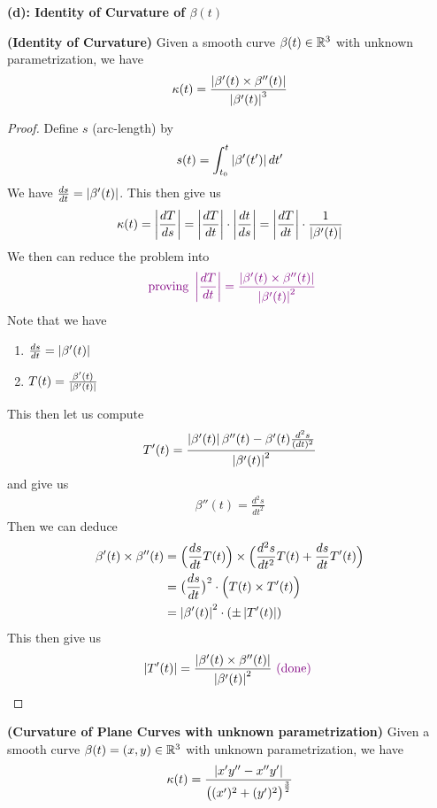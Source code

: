 \documentclass{report}
\begin{document}
\textbf{(d): Identity of Curvature of $\beta(t)$} 
\begin{theorem}
\textbf{(Identity of Curvature)} Given a smooth curve $\beta (t)\in\mathbb{R}^3$ with unknown parametrization, we have 
\begin{align*}
\kappa(t)=\frac{\left|\beta '(t)\times \beta ''(t)\right|}{\left|\beta '(t)\right|^3}
\end{align*}
\end{theorem}
\begin{proof}
Define $s$  (arc-length) by
\begin{align*}
s(t)=\int_{t_0}^{t} \left|\beta '(t')\right|dt'
\end{align*}
We have $\frac{ds}{dt}=\left|\beta' (t)\right|$. This then give us  
\begin{align*}
\kappa (t)= \left|\frac{dT}{ds}\right|=\left|\frac{dT}{dt}\right|\cdot \left|\frac{dt}{ds}\right|=\left|\frac{dT}{dt}\right|\cdot \frac{1}{\left|\beta '(t)\right|}
\end{align*}
We then can reduce the problem into 
\begin{align*}
\textcolor{violet}{\text{ proving }\left|\frac{dT}{dt}\right|=\frac{\left|\beta '(t)\times \beta ''(t)\right|}{\left|\beta '(t)\right|^2}}
\end{align*}
Note that we have 
\begin{enumerate}[label=(\alph*)]
  \item $\frac{ds}{dt}=\left|\beta '(t)\right|$ 
  \item $T(t)=\frac{\beta '(t)}{\left|\beta '(t)\right|}$
\end{enumerate}
This then let us compute 
\begin{align*}
T'(t)= \frac{\left|\beta '(t)\right|\beta ''(t) -\beta '(t) \frac{d^2s}{(dt)^2}}{\left|\beta '(t)\right|^2}
\end{align*}
and give us 
\begin{align*}
\beta ''(t)=\frac{d^2 s}{dt^2}
\end{align*}
Then we can deduce 
\begin{align*}
\beta '(t)\times \beta ''(t)&= \Big(\frac{ds}{dt}T(t) \Big)\times \Big( \frac{d^2s}{dt^2}T(t)+\frac{ds}{dt}T'(t) \Big)\\
&=\big(\frac{ds}{dt} \big)^2 \cdot \Big(T(t)\times T'(t) \Big)\\
&=\left|\beta '(t)\right|^2 \cdot (\pm \left|T'(t)\right|)
\end{align*}
This then give us 
\begin{align*}
\left|T'(t)\right|=\frac{\left|\beta '(t)\times \beta ''(t)\right|}{\left|\beta '(t)\right|^2}\textcolor{violet}{\text{ (done) }}
\end{align*}
\end{proof}
\begin{corollary}
\textbf{(Curvature of Plane Curves with unknown parametrization)} Given a smooth curve $\beta (t)=(x,y)\in\mathbb{R}^3$ with unknown parametrization, we have 
\begin{align*}
  \kappa(t)=\frac{\left|x'y''-x''y'\right|}{\big((x')^2+(y')^2 \big)^{\frac{3}{2}}}
\end{align*}
\end{corollary}
\end{document}
